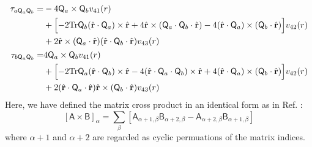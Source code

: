 \begin{align}
%
%
%
%
%
%
\begin{split}
\mathbf{\tau}_{a \mathsf{Q}_a \mathsf{Q}_b} =&
-4 
\mathsf{Q}_a \times \mathsf{Q}_b
v_{41}(r) \\
&+ 
\Bigl[-2\text{Tr}\mathsf{Q}_b
(\hat{\mathbf{r}} \cdot \mathsf{Q}_a ) \times \hat{\mathbf{r}}
+4 \hat{\mathbf{r}} \times 
( \mathsf{Q}_a \cdot \mathsf{Q}_b \cdot \hat{\mathbf{r}}) 
-4 (\hat{\mathbf{r}} \cdot \mathsf{Q}_a )\times 
( \mathsf{Q}_b \cdot \hat{\mathbf{r}} ) \Bigr] v_{42}(r) \\
&+ 2
\hat{\mathbf{r}} \times ( \mathsf{Q}_a \cdot \hat{\mathbf{r}})
(\hat{\mathbf{r}} \cdot \mathsf{Q}_b \cdot \hat{\mathbf{r}}) v_{43}(r) \end{split}\\
%
%
%
\begin{split}
\mathbf{\tau}_{b \mathsf{Q}_a \mathsf{Q}_b} =  
&4
\mathsf{Q}_a \times \mathsf{Q}_b v_{41}(r) \\
&+  \Bigl[- 2\text{Tr}\mathsf{Q}_a
(\hat{\mathbf{r}} \cdot \mathsf{Q}_b ) \times \hat{\mathbf{r}}
-4  (\hat{\mathbf{r}} \cdot \mathsf{Q}_a \cdot 
\mathsf{Q}_b ) \times
\hat{\mathbf{r}} 
+4 ( \hat{\mathbf{r}} \cdot \mathsf{Q}_a ) \times 
( \mathsf{Q}_b \cdot \hat{\mathbf{r}})
\Bigr] v_{42}(r) \\
&+2
(\hat{\mathbf{r}} \cdot \mathsf{Q}_a \cdot \hat{\mathbf{r}})
\hat{\mathbf{r}} \times ( \mathsf{Q}_b \cdot \hat{\mathbf{r}}) v_{43}(r)\end{split}
\end{align}
%
Here, we have defined the matrix cross product in an identical form
as in Ref. \cite{Smith98}:
\begin{equation}
\left[\mathsf{A} \times \mathsf{B}\right]_\alpha = \sum_\beta
\left[\mathsf{A}_{\alpha+1,\beta} \mathsf{B}_{\alpha+2,\beta}
  -\mathsf{A}_{\alpha+2,\beta} \mathsf{B}_{\alpha+1,\beta} 
\right]
\label{eq:matrixCross}
\end{equation}
where $\alpha+1$ and $\alpha+2$ are regarded as cyclic
permuations of the matrix indices.

